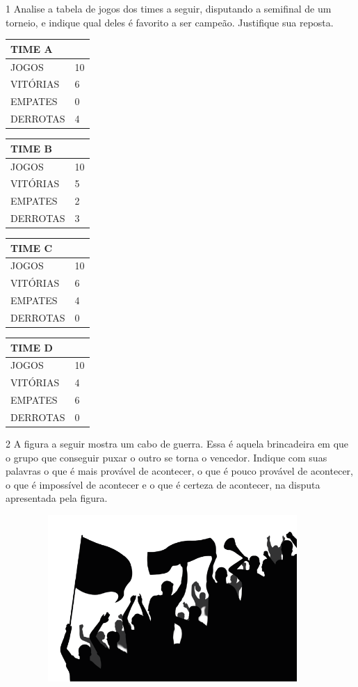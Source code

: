 
\num{1} Analise a tabela de jogos dos times a seguir, disputando a semifinal de um
torneio, e indique qual deles é favorito a ser campeão. Justifique sua reposta.

\begin{longtable}[]{@{}ll@{}}
\toprule
TIME A\tabularnewline
\midrule
\endhead
JOGOS & 10\tabularnewline
VITÓRIAS & 6\tabularnewline
EMPATES & 0\tabularnewline
DERROTAS & 4\tabularnewline
\bottomrule
\end{longtable}

\begin{longtable}[]{@{}ll@{}}
\toprule
TIME B\tabularnewline
\midrule
\endhead
JOGOS & 10\tabularnewline
VITÓRIAS & 5\tabularnewline
EMPATES & 2\tabularnewline
DERROTAS & 3\tabularnewline
\bottomrule
\end{longtable}

\begin{longtable}[]{@{}ll@{}}
\toprule
TIME C\tabularnewline
\midrule
\endhead
JOGOS & 10\tabularnewline
VITÓRIAS & 6\tabularnewline
EMPATES & 4\tabularnewline
DERROTAS & 0\tabularnewline
\bottomrule
\end{longtable}

\begin{longtable}[]{@{}ll@{}}
\toprule
TIME D\tabularnewline
\midrule
\endhead
JOGOS & 10\tabularnewline
VITÓRIAS & 4\tabularnewline
EMPATES & 6\tabularnewline
DERROTAS & 0\tabularnewline
\bottomrule
\end{longtable}


\num{2} A figura a seguir mostra um cabo de guerra. Essa é aquela brincadeira em
que o grupo que conseguir puxar o outro se torna o vencedor. Indique com
suas palavras o que é mais provável de acontecer, o que é pouco provável
de acontecer, o que é impossível de acontecer e o que é certeza de
acontecer, na disputa apresentada pela figura.


\includegraphics[width=5.00000in,height=2.48958in]{media/image84.png}

